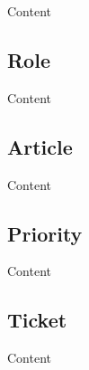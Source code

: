 Content


\subsection{Role}

Content


\subsection{Article}

Content


\subsection{Priority}

Content



\subsection{Ticket}

Content

